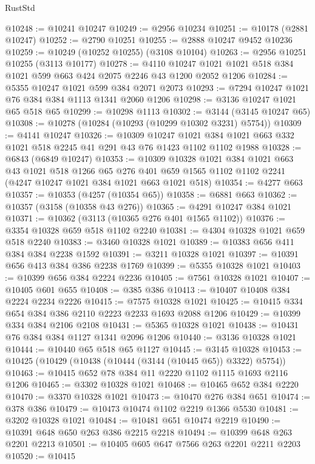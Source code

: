 \begin{lexlean}{RustStd}
\begin{coremodule}
@10248 := @10241 @10247
@10249 := @2956 @10234
@10251 := @10178 (@2881 @10247)
@10252 := @2790 @10251
@10255 := @2888 @10247 @9452 @10236
@10259 := @10249 (@10252 @10255) (@3108 @10104)
@10263 := @2956 @10251 @10255 (@3113 @10177)
@10278 := @4110 @10247 @1021 @1021 @518 @384 @1021 @599 @663 @424 @2075 @2246 @43 @1200 @2052 @1206
@10284 := @5355 @10247 @1021 @599 @384 @2071 @2073
@10293 := @7294 @10247 @1021 @76 @384 @384 @1113 @1341 @2060 @1206
@10298 := @3136 @10247 @1021 @65 @518 @65
@10299 := @10298 @1113
@10302 := @3144 (@3145 @10247 @65)
@10308 := @10278 (@10284 (@10293 (@10299 @10302 @3231) @5754))
@10309 := @4141 @10247
@10326 := @10309
    @10247
    @1021
    @384
    @1021
    @663
    @332
    @1021
    @518
    @2245
    @41
    @291
    @43
    @76
    @1423
    @1102
    @1102
    @1988
@10328 := @6843 (@6849 @10247)
@10353 := @10309
    @10328
    @1021
    @384
    @1021
    @663
    @43
    @1021
    @518
    @1266
    @65
    @276
    @401
    @659
    @1565
    @1102
    @1102
    @2241
    (@4247 @10247 @1021 @384 @1021 @663 @1021 @518)
@10354 := @4277 @663
@10357 := @10353 (@4257 (@10354 @65))
@10358 := @6881 @663
@10362 := @10357 (@3158 (@10358 @43 @276))
@10365 := @4291 @10247 @384 @1021
@10371 := @10362 (@3113 (@10365 @276 @401 @1565 @1102))
@10376 := @3354 @10328 @659 @518 @1102 @2240
@10381 := @4304 @10328 @1021 @659 @518 @2240
@10383 := @3460 @10328 @1021
@10389 := @10383 @656 @411 @384 @384 @2238 @1592
@10391 := @3211 @10328 @1021
@10397 := @10391 @656 @413 @384 @386 @2238 @1769
@10399 := @5355 @10328 @1021
@10403 := @10399 @656 @384 @2224 @2236
@10405 := @7561 @10328 @1021
@10407 := @10405 @601 @655
@10408 := @385 @386
@10413 := @10407 @10408 @384 @2224 @2234 @2226
@10415 := @7575 @10328 @1021
@10425 := @10415 @334 @654 @384 @386 @2110 @2223 @2233 @1693 @2088 @1206
@10429 := @10399 @334 @384 @2106 @2108
@10431 := @5365 @10328 @1021
@10438 := @10431 @76 @384 @384 @1127 @1341 @2096 @1206
@10440 := @3136 @10328 @1021
@10444 := @10440 @65 @518 @65 @1127
@10445 := @3145 @10328
@10453 := @10425 (@10429 (@10438 (@10444 (@3144 (@10445 @65)) @3322) @5754))
@10463 := @10415 @652 @78 @384 @11 @2220 @1102 @1115 @1693 @2116 @1206
@10465 := @3302 @10328 @1021
@10468 := @10465 @652 @384 @2220
@10470 := @3370 @10328 @1021
@10473 := @10470 @276 @384 @651
@10474 := @378 @386
@10479 := @10473 @10474 @1102 @2219 @1366 @5530
@10481 := @3202 @10328 @1021
@10484 := @10481 @651 @10474 @2219
@10490 := @10391 @648 @650 @263 @386 @2215 @2218
@10494 := @10399 @648 @263 @2201 @2213
@10501 := @10405 @605 @647 @7566 @263 @2201 @2211 @2203
@10520 := @10415

\end{coremodule}
\end{lexlean}

